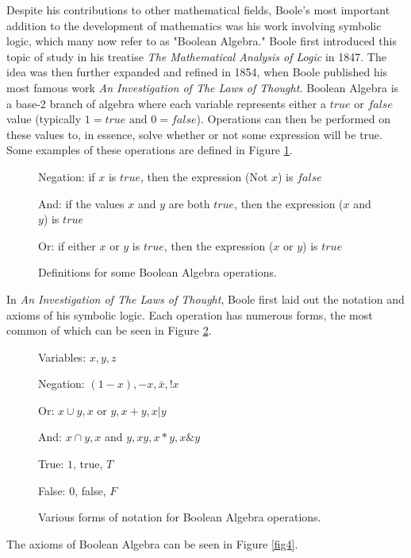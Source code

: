 \documentclass[12]{article} %
\begin{document}
Despite his contributions to other mathematical fields, Boole's most important addition to the development of mathematics was his work involving symbolic logic, which many now refer to as "Boolean Algebra." Boole first introduced this topic of study in his treatise \textit{The Mathematical Analysis of Logic} in 1847. The idea was then further expanded and refined in 1854, when Boole published his most famous work \textit{An Investigation of The Laws of Thought.} Boolean Algebra is a base-2 branch of algebra where each variable represents either a $true$ or $false$ value (typically $1 = true \text{ and } 0 = false$). Operations can then be performed on these values to, in essence, solve whether or not some expression will be true. Some examples of these operations are defined in Figure \ref{fig2}. 

\begin{figure}[H]
\centerline{Negation: if $x$ is $true$, then the expression (Not $x$) is $false$}
\centerline{And: if the values $x$ and $y$ are both $true$, then the expression ($x$ and $y$) is $true$}
\centerline{Or: if either $x$ or $y$ is $true$, then the expression ($x$ or $y$) is $true$}
\caption{Definitions for some Boolean Algebra operations.}\label{fig2}
\end{figure}

In \textit{An Investigation of The Laws of Thought}, Boole first laid out the notation and axioms of his symbolic logic. Each operation has numerous forms, the most common of which can be seen in Figure \ref{fig3}.

\begin{figure}[H]
\centerline{Variables: $x,y,z$}
\centerline{Negation: $(1-x), -x, \bar{x}, !x$}
\centerline{Or: $x\cup y, x$ or $y, x + y, x | y$}
\centerline{And: $x \cap y, x$ and $y, xy, x*y, x \& y$}
\centerline{True: $1$, true, $T$}
\centerline{False: $0$, false, $F$}
\caption{Various forms of notation for Boolean Algebra operations.}\label{fig3}
\end{figure}
\noindent
The axioms of Boolean Algebra can be seen in Figure \ref{fig4}.
\end{document}
